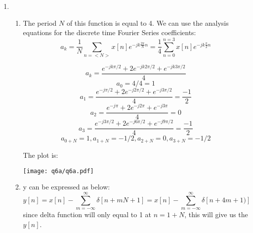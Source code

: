 \documentclass[10pt,a4paper, margin=1in]{article}
\begin{document}
\begin{enumerate}
\item %
    \begin{enumerate}
    \item %
    The period $N$ of this function is equal to 4. We can use the analysis equations for the discrete time Fourier Series  coefficients:
    \begin{equation*}
        a_k = \frac{1}{N}\sum_{n = <N>} x[n]e^{-jk\frac{2\pi}{N}n} =  \frac{1}{4}\sum_{n = 0}^{n = 3} x[n]e^{-jk\frac{\pi}{2}n}
    \end{equation*}

    \begin{equation}
        a_k = \frac{e^{-jk\pi/2} + 2e^{-jk2\pi/2} + e^{-jk3\pi/2}}{4}
    \end{equation}
    \begin{equation}
        a_0 = 4/4 = 1
    \end{equation}
    \begin{equation}
        a_1 = \frac{e^{-j\pi/2} + 2e^{-j2\pi/2} + e^{-j3\pi/2}}{4} = \frac{-1}{2}
    \end{equation}
    \begin{equation}
        a_2 = \frac{e^{-j\pi} + 2e^{-j2\pi} + e^{-j3\pi}}{4} = 0
    \end{equation}
    \begin{equation}
        a_3 = \frac{e^{-j3\pi/2} + 2e^{-j6\pi/2} + e^{-j9\pi/2}}{4} = \frac{-1}{2}
    \end{equation}
    \begin{equation}
        a_{0+N} =1, a_{1+N} = -1/2, a_{2+N}=0, a_{3+N} = -1/2
    \end{equation}

    The plot is:
    \begin{center}
        \texttt{[image: q6a/q6a.pdf]}
    \end{center}
    \item %
    y can be expressed as below:
    \begin{equation*}
        y[n] = x[n] - \sum_{m = -\infty}^{\infty} \delta[n+mN+1] = x[n] - \sum_{m = -\infty}^{\infty} \delta[n+4m+1)]
    \end{equation*}
    since delta function will only equal to 1 at $n = 1 + N$, this will give us the $y[n]$.


\end{enumerate}
\end{enumerate}
\end{document}
